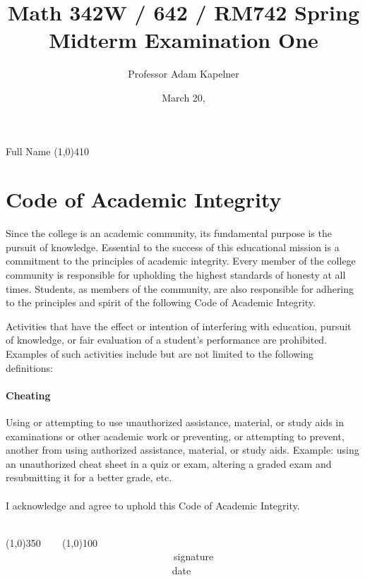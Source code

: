 \documentclass[12pt]{article}
\title{Math 342W / 642 / RM742 Spring \the\year{} \\ Midterm Examination One}
\author{Professor Adam Kapelner}
\date{March 20, \the\year{}}
\begin{document}
\maketitle

\noindent Full Name \line(1,0){410}

\thispagestyle{empty}

\section*{Code of Academic Integrity}

\footnotesize
Since the college is an academic community, its fundamental purpose is the pursuit of knowledge. Essential to the success of this educational mission is a commitment to the principles of academic integrity. Every member of the college community is responsible for upholding the highest standards of honesty at all times. Students, as members of the community, are also responsible for adhering to the principles and spirit of the following Code of Academic Integrity.

Activities that have the effect or intention of interfering with education, pursuit of knowledge, or fair evaluation of a student's performance are prohibited. Examples of such activities include but are not limited to the following definitions:

\paragraph{Cheating} Using or attempting to use unauthorized assistance, material, or study aids in examinations or other academic work or preventing, or attempting to prevent, another from using authorized assistance, material, or study aids. Example: using an unauthorized cheat sheet in a quiz or exam, altering a graded exam and resubmitting it for a better grade, etc.\\
\\
\noindent I acknowledge and agree to uphold this Code of Academic Integrity. \\~\\

\begin{center}
\line(1,0){350} ~~~ \line(1,0){100}\\
~~~~~~~~~~~~~~~~~~~~~~~~~~~~~~~~~~signature~~~~~~~~~~~~~~~~~~~~~~~~~~~~~~~~~~~~~~~~~~~~~~~~~~~~~~~~~~~~~~ date
\end{center}

\normalsize
\end{document}
